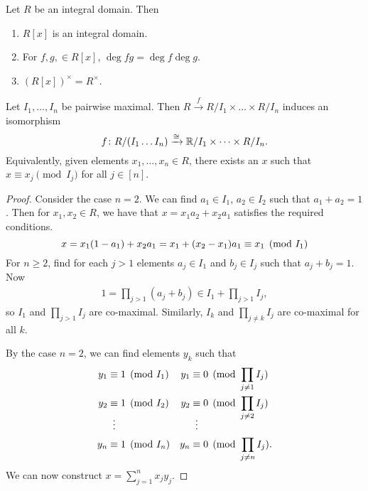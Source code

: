 
\begin{lemma}
    Let $R$ be an integral domain.
    Then
    \begin{enumerate}
        \item $R[x]$ is an integral domain.
        \item For $f, g, \in R[x]$, $\deg fg = \deg f \deg g$.
        \item $(R[x])^\times = R^\times$.
    \end{enumerate}
\end{lemma}

\begin{theorem} \label{thm:crt}
    Let $I_1, \dots, I_n$ be pairwise maximal.
    Then $R \xrightarrow{f} R/I_1 \times \dots \times R/I_n$ induces an
    isomorphism \[
        f\colon R/(I_1 \dots I_n) \xrightarrow{\cong} \mathbb{R}/I_1 \times \dots \times R/I_n.
    \]
    Equivalently, given elements $x_1, \dots, x_n \in R$, there exists an
    $x$ such that $x \equiv x_j \pmod{I_j}$ for all $j \in [n]$.
\end{theorem}
\begin{proof}
    Consider the case $n = 2$.
    We can find $a_1 \in I_1$, $a_2 \in I_2$ such that $a_1 + a_2 = 1$.
    Then for $x_1, x_2 \in R$, we have that $x = x_1 a_2 + x_2 a_1$
    satisfies the required conditions. \[
        x = x_1 (1 - a_1) + x_2 a_1
          = x_1 + (x_2 - x_1) a_1
          \equiv x_1 \pmod{I_1} \\
    \]
    For $n \ge 2$, find for each $j > 1$ elements $a_j \in I_1$ and
    $b_j \in I_j$ such that $a_j + b_j = 1$.
    Now \begin{align*}
        1 = \prod_{j>1} (a_j + b_j) \in I_1 + \prod_{j>1} I_j,
    \end{align*} so $I_1$ and $\prod_{j>1} I_j$ are co-maximal.
    Similarly, $I_k$ and $\prod_{j \ne k} I_j$ are co-maximal for all $k$.

    By the case $n = 2$, we can find elements $y_k$ such that \begin{align*}
        y_1 &\equiv 1 \pmod{I_1} & y_1 &\equiv 0 \pmod{\prod_{j\ne1} I_j} \\
        y_2 &\equiv 1 \pmod{I_2} & y_2 &\equiv 0 \pmod{\prod_{j\ne2} I_j} \\[-1em]
        &\vdotswithin{\equiv} & &\vdotswithin{\equiv} \\
        y_n &\equiv 1 \pmod{I_n} & y_n &\equiv 0 \pmod{\prod_{j\ne n} I_j}.
    \end{align*}
    We can now construct $x = \sum_{j=1}^n x_j y_j$.
\end{proof}


